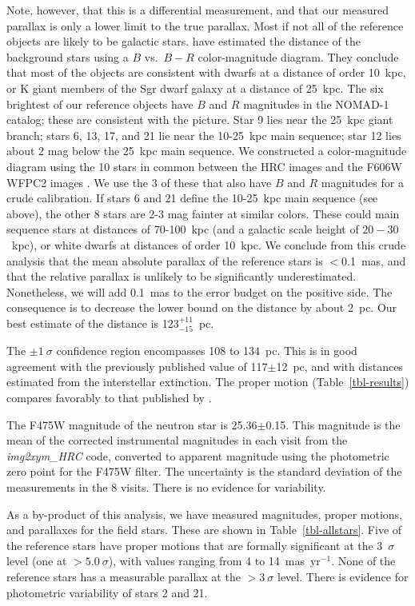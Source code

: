 \documentclass[12pt,preprint]{aastex}
\newcommand{\ud}[2]{\mbox{$^{+ #1}_{- #2}$}}
\begin{document}
Note, however, that this is a differential measurement, and that our
measured parallax is only a lower limit to the true parallax. Most if
not all of the reference objects are likely to be galactic stars.
\cite{KvKA02} have estimated the distance of the background stars using a
$B$ vs.\ $B-R$ color-magnitude diagram. They conclude that most of the 
objects are consistent with dwarfs at a distance of order 10~kpc, or K giant
members of the Sgr dwarf galaxy at a distance of 25~kpc. 
The six brightest of our reference objects have $B$ and $R$ magnitudes in the
NOMAD-1 catalog; these are consistent with the \cite{KvKA02} picture.
Star 9 lies near the 25~kpc giant branch; stars 6, 13, 17, and 21 lie near
the 10-25~kpc main sequence; star 12 lies about 2 mag below the 25~kpc main
sequence. We constructed a color-magnitude diagram using the 10 stars
in common between the HRC images and the F606W WFPC2 images \citep{W01}. 
We use the 3 of these that also
have $B$ and $R$ magnitudes for a crude calibration.
If stars 6 and 21 define the 10-25~kpc main sequence (see
above), the other 8 stars
are 2-3 mag fainter at similar colors. These could main sequence stars
at distances of 70-100~kpc (and a galactic scale height of $20-30$~kpc), 
or white dwarfs at distances of order 10~kpc.
We conclude from this
crude analysis that the mean absolute parallax of the reference stars is
$<$0.1~mas, and that the relative parallax is unlikely to be significantly
underestimated. Nonetheless, we will add 0.1~mas to the error budget on the
positive side. The consequence is to decrease the lower bound on the
distance by about 2~pc. Our best estimate of the distance is
123\ud{11}{15}~pc.

The $\pm 1~\sigma$ confidence region encompasses 108 to 134~pc. 
This is in good agreement with the previously published value of
117$\pm$12~pc, and with distances estimated from the interstellar extinction.
The proper motion (Table~\ref{tbl-results}) compares favorably to that
published by \citet{WL02}.

The F475W magnitude of the neutron star is 25.36$\pm$0.15. This magnitude
is the mean of the corrected instrumental magnitudes in each visit from the
{\it img2xym\_HRC} code, converted to apparent magnitude using the photometric
zero point for the F475W filter.
The uncertainty is the standard deviation of the measurements in the 8 visits.
There is no evidence for variability.

As a by-product of this analysis, we have measured
magnitudes, proper motions, and
parallaxes for the field stars. These are shown in Table~\ref{tbl-allstars}.
Five of the reference stars have proper motions that are
formally significant at the 
3~$\sigma$ level (one at $>5.0~\sigma$), with values ranging from 4 to
14~mas~yr$^{-1}$.
None of the reference stars has a measurable parallax
at the $>3~\sigma$ level. There is evidence for photometric variability of
stars 2 and 21.
\end{document}
